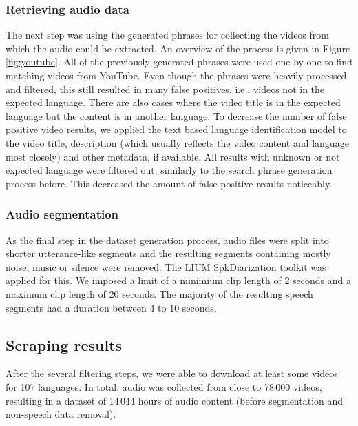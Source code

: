 \documentclass{article}
\begin{document}
\subsubsection{Retrieving audio data}

The next step was using the generated phrases for collecting the videos from which the audio could be extracted.
An overview of the process is given in Figure \ref{fig:youtube}.
All of the previously generated phrases were used one by one to find matching
videos from YouTube. Even though the phrases were heavily processed and filtered, this still resulted
in many false positives, i.e., videos not in the expected language.
There are also cases where the video title is in the
expected language but the content is in another language.
To decrease the number of false positive
video results, we applied the text based language identification model to 
the video title, description (which usually reflects the video content
and language most closely) and other metadata, if available. All
results with unknown or not expected language were filtered out, similarly to the search
phrase generation process before. This decreased the amount of false positive results
noticeably. 

\subsubsection{Audio segmentation}

As the final step in the dataset generation process, audio files were split into shorter utterance-like segments and 
the resulting segments containing mostly noise, music or silence were removed. The LIUM SpkDiarization toolkit \cite{rouvier2013open} was applied for this. We imposed a limit of a minimium clip length of 2 seconds and a maximum clip length of 20 seconds. The majority of the resulting speech segments had a
duration between 4 to 10 seconds.

\subsection{Scraping results}

After the several filtering steps, we were able to download at least some videos for 107 languages. 
In total, audio was collected from close to 78\,000 videos, resulting in a dataset of 14\,044 hours of audio content (before segmentation and non-speech data removal). 
\end{document}
